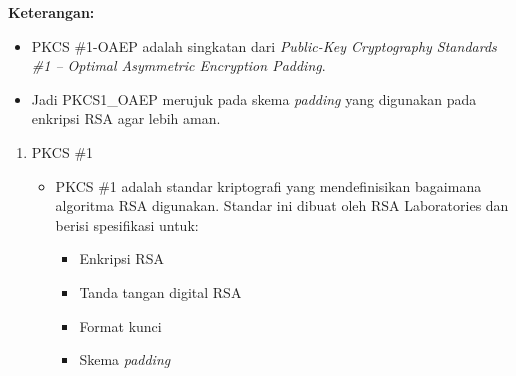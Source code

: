 \documentclass{article}
\begin{document}

\textbf{Keterangan:}
\begin{itemize}
    \item PKCS \#1-OAEP adalah singkatan dari \textit{Public-Key Cryptography Standards \#1 -- Optimal Asymmetric Encryption Padding}.
    \item Jadi PKCS1\_OAEP merujuk pada skema \textit{padding} yang digunakan pada enkripsi RSA agar lebih aman.
\end{itemize}

\begin{enumerate}
    \item PKCS \#1
    \begin{itemize}
        \item PKCS \#1 adalah standar kriptografi yang mendefinisikan bagaimana algoritma RSA digunakan.
        Standar ini dibuat oleh RSA Laboratories dan berisi spesifikasi untuk:
        \begin{itemize}
            \item Enkripsi RSA
            \item Tanda tangan digital RSA
            \item Format kunci
            \item Skema \textit{padding}
        \end{itemize}
    \end{itemize}
\end{enumerate}
\end{document}

